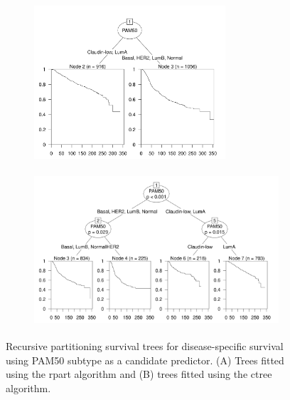 
\begin{figure}[!h]
\begin{minipage}{.44\textwidth}
\begin{subfigure}{\textwidth}
\subcaption{}
\includegraphics[width=\linewidth, height = 5.7cm]{../figures/Chapter_3/Ind_Partykit_Survival_Score_DSS_PAM50.png}
\end{subfigure}\par
\end{minipage}
\begin{minipage}{.55\textwidth}
\begin{subfigure}{\textwidth}
\subcaption{}
\includegraphics[width=\linewidth, height = 5.7cm]{../figures/Chapter_3/Ind_Ctree_Survival_Score_DSS_PAM50.png}
\end{subfigure}\par
\end{minipage}

\caption[Recursive partitioning survival trees for disease-specific survival using PAM50 subtype as a candidate predictor.]{Recursive partitioning survival trees for disease-specific survival using PAM50 subtype as a candidate predictor. (A) Trees fitted using the rpart algorithm and (B) trees fitted using the ctree algorithm.}
\label{fig:PAM50_Indv_Surv_Trees}
\end{figure}


